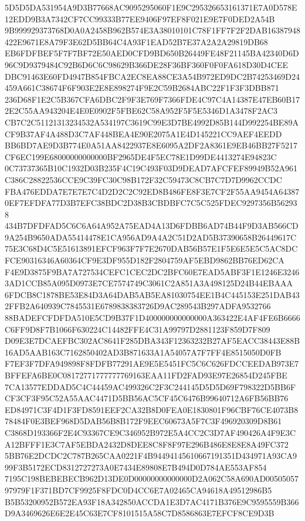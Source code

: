 \documentclass[UTF8,fontset=fandol,zihao=-4,a4paper]{ctexart}
\begin{document}
{{5D5D5DA531954A9D3B77668AC9095295060F1E9C295326653161371E7A0D578E12EDD9B3A7342CF7CC99333B77EE9406F97EF8F021E9E7F0DED2A54B
9B999929373768D0A0A2458B962B574E3A38010101C78F1FF7F2F2DAB16387948422E9671E8A79F3E62D5BB64C4A93F1EAD52B7E37A2A2A29819DB68
EB6FDFBEF5F7F7BF72E50AED0CFD9BD650B26449FE48F21145BA42340D6D96C9D9379484C92B6D6C6C98629B366DE28F36BF360F0F0FA618D30D4CEE
DBC91463E60FD4947B854FBCA2EC8EA88CE3A54B972ED9DC2B74253469D24459A661C38674F6F903E2E8E898274F9E2C59B2684ABC22F1F3F3DBB871
236D68F1E2C5B367CFA6DBC2F9F3E769F7366FDE4C97C4A14387E47EB60B172E2C55AA943204E4E0E0902F5FBE62C58A952F5F5E5346D1A3478F2AC3
CB7C2C51121313234532A534197C3619C99E3D7BE4992D85B144D992254BE89ACF9B37AF4A488D3C7AF448BEA4E90E2075A1E4D145221CC9AEF4EEDD
BB6BD7AE9D3B774E0A51AA8422937E8E6095A2DF2A8361E9EB46BB27F5217CF6EC199E68000000000000BF2965DE4F5EC78E1D99DE4413274E94823C
0C73737365B10C1932D03B235F4C19C493F03D9DEAD7AFCFEF89949B52A961C386C28822536CCE9C39FC30C98B172F32C59473C8CB7C7D7D9962CCDC
FBA476EDDA7E7E7E7C4D2D2C2C92ED8B486FE8F3E7CF2F55AA9454A643870EF7EFDFA77D3B7EFC38BDC2D38B3CBDBFC7C5C525FDEC9297356B562938
434B7DFDFAD5C6C6A64A952A75EAD4A13D6FDBB6AD74B44F9D3AB566CD9A254B9650ADA55414478E1CA956AD9A4A2C51D2AD5B37390658B26449617C
75E3C68D4C5E51613891EFCF963F7F7E2670DAB56B57E1F5E6E5E5C5AC8DCFCE90316346A60364CF9E3DF955D182F2804759AF5EBD9862BB76ED62CA
F4E9D3875F9BA7A727534CEFC1CEC2DC2BFC60E7EAD5ABF3F1E1246E32463AD1CCB85A095D0973E7CE7574749C3061C2A851A3A498125D24B44EBAAA
6FDCB8C1878BE53E84D3A64DAB5AB5EA81030754EE1B4C445153E251DAB432FFB2A640939C7845531E6789838383726D9AC289543B297ADFA9532766
88BADEFCFDFDA510E5CD9B37F1D400000000000000A363422E4AF4FE6B6666C6FF9D8F7B1066F630224C14482FFE4C31A99797D2881123F859D7F809
D09E3E7DCAEFBC302AC8641F285DBA343F12363232B27AF5EACC38443E88B16AD5AAB163C7162850402AD3B871633A1A54057A7F7FF4E8515050D0FB
F7EF3F7DFA949898F8FDFB77291AE9E5E5451FC5C6C626FDCCEEDAB973E7BFFEFA6BE0C08172771777777769163EAA11FD2FAD93E97E26854D245FBE
7CA13577EDDAD5C4C44459AC499326C2F3C244145D5D5D69F798322D5BB6FCF3CF3F95C52A55AAC4471D5BB56AC5CF45C6476B99640712A6FB56BB76
ED84971C3F4D1F3FD8591EEF2CA32B8D0FEA0E1830801F96CBF76CE4073B878484F0E3BEF968D5DAB56B8B172F9EEC60673A5F7C3F496920309D8B61
C3868D193366F2E4C93367CE9C346952B972E5A4CC2C3D7AF490426A4F9E3CA12BFFF1E3C7AF5EBDA2432D8DEE8C8F8F97E296B486E8E8E8A49FC372
5BB76E2DCDC2C787B265CAA0221F4B94494145610667191351D434971A93CA999F3B5172ECD8312727273A0E7434E89808E7B494D0D784AE553AF854
7195C198BEBEBECB962D13DE0D00000000000000D2A062C58A690AD0050505797979F1F371BD7CF9925F8FDC0D4CC6E7A02465CA94618A49512986B5
B5B53200952B572EA93F18A342850ACCDA1E3D7AC4171B376E9C9595559B366D9A3469626E6E2E45C63E7CF8101515A58C7D8586863E7EFCF8CE9D3B
}}
\end{document}
